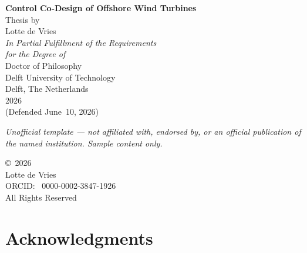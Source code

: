 \documentclass[11pt,twoside,openright]{book}
\begin{document}
\begin{titlepage}
\thispagestyle{empty}
\begin{center}

\vspace*{0.15\textheight}

{\Huge\bfseries Control Co-Design of Offshore Wind Turbines}\\[36pt]

{\LARGE Thesis by}\\[18pt]

{\LARGE Lotte de Vries}\\[48pt]

{\large\textit{In Partial Fulfillment of the Requirements\\[4pt]
for the Degree of}}\\[18pt]

{\LARGE Doctor of Philosophy}\\[48pt]

{\large Delft University of Technology}\\[6pt]
{\large Delft, The Netherlands}\\[30pt]

{\large 2026}\\[18pt]

{\normalsize\color{MidGray}(Defended June~10, 2026)}

\vfill
{\footnotesize\itshape Unofficial template --- not affiliated with, endorsed by, or an official publication of the named institution. Sample content only.}
\end{center}
\end{titlepage}

\cleardoublepage
\thispagestyle{empty}
\vspace*{0.4\textheight}

\begin{center}
{\large\copyright\ 2026}\\[12pt]
{\large Lotte de Vries}\\[12pt]
{\normalsize ORCID: \faOrcid\ 0000-0002-3847-1926}\\[24pt]
{\normalsize All Rights Reserved}
\end{center}

\cleardoublepage
\chapter*{Acknowledgments}
\end{document}
